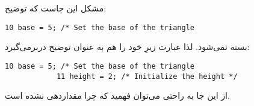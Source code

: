 \section{}
\paragraph{}\label{answer:62}
مشکل این جاست که توضیح:
\begin{LTR}
        \begin{lstlisting}[style=C++Style]
            10 base = 5; /* Set the base of the triangle
        \end{lstlisting}
\end{LTR}

بسته نمی‌شود. لذا عبارت زیرِ خود را هم به عنوان توضیح دربرمی‌گیرد:
\begin{LTR}
        \begin{lstlisting}[style=C++Style]
            10 base = 5; /* Set the base of the triangle
            11 height = 2; /* Initialize the height */
        \end{lstlisting}
\end{LTR}

از این جا به راحتی می‌توان فهمید که چرا  مقداردهی نشده است.